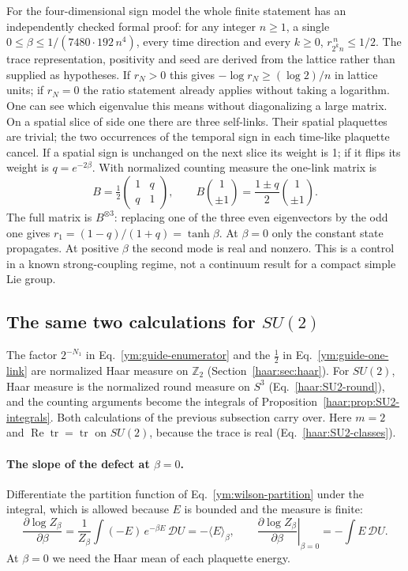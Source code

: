 For the four-dimensional sign model the whole finite statement has an
independently checked formal proof: for any integer $n\ge1$, a single
$0\le\beta\le 1/(7480\cdot192\,n^4)$, every time direction and every
$k\ge0$, $r_{2^kn}^{\,n}\le1/2$. The trace representation, positivity and
seed are derived from the lattice rather than supplied as hypotheses.
If $r_N>0$ this gives $-\log r_N\ge(\log2)/n$ in lattice units; if
$r_N=0$ the ratio statement already applies without taking a logarithm.
One can see which eigenvalue this means without diagonalizing a large
matrix. On a spatial slice of side one there are three self-links. Their
spatial plaquettes are trivial; the two occurrences of the temporal sign
in each time-like plaquette cancel. If a spatial sign is unchanged on
the next slice its weight is 1; if it flips its weight is
$q=e^{-2\beta}$. With normalized counting measure the one-link matrix is
\begin{equation}\label{ym:guide-one-link}
 B=\tfrac12\begin{pmatrix}1&q\\q&1\end{pmatrix},\qquad
 B\binom{1}{\pm1}=\frac{1\pm q}{2}\binom{1}{\pm1}.
\end{equation}
The full matrix is $B^{\otimes3}$: replacing one of the three even
eigenvectors by the odd one gives $r_1=(1-q)/(1+q)=\tanh\beta$.
At $\beta=0$ only the constant state propagates. At positive $\beta$ the
second mode is real and nonzero. This is a control in a known
strong-coupling regime, not a continuum result for a compact simple Lie group.

\subsection{The same two calculations for \texorpdfstring{$SU(2)$}{SU(2)}}\label{ym:sec:guide-su2-haar}
The factor $2^{-N_1}$ in Eq.~\eqref{ym:guide-enumerator} and the $\tfrac12$
in Eq.~\eqref{ym:guide-one-link} are normalized Haar measure on
$\mathbb Z_2$ (Section~\ref{haar:sec:haar}). For $SU(2)$, Haar measure is
the normalized round measure on $S^3$ (Eq.~\eqref{haar:SU2-round}), and the
counting arguments become the integrals of
Proposition~\ref{haar:prop:SU2-integrals}. Both calculations of the
previous subsection carry over. Here $m=2$ and
$\operatorname{Re}\operatorname{tr}=\operatorname{tr}$ on $SU(2)$, because
the trace is real (Eq.~\eqref{haar:SU2-classes}).

\paragraph{The slope of the defect at $\beta=0$.}
Differentiate the partition function of Eq.~\eqref{ym:wilson-partition}
under the integral, which is allowed because $E$ is bounded and the
measure is finite:
\begin{equation}\label{ym:guide-logZ-slope}
 \frac{\partial\log Z_\beta}{\partial\beta}
 =\frac{1}{Z_\beta}\int(-E)\,e^{-\beta E}\,\mathcal DU
 =-\langle E\rangle_\beta,
 \qquad
 \left.\frac{\partial\log Z_\beta}{\partial\beta}\right|_{\beta=0}
 =-\int E\,\mathcal DU .
\end{equation}
At $\beta=0$ we need the Haar mean of each plaquette energy.

